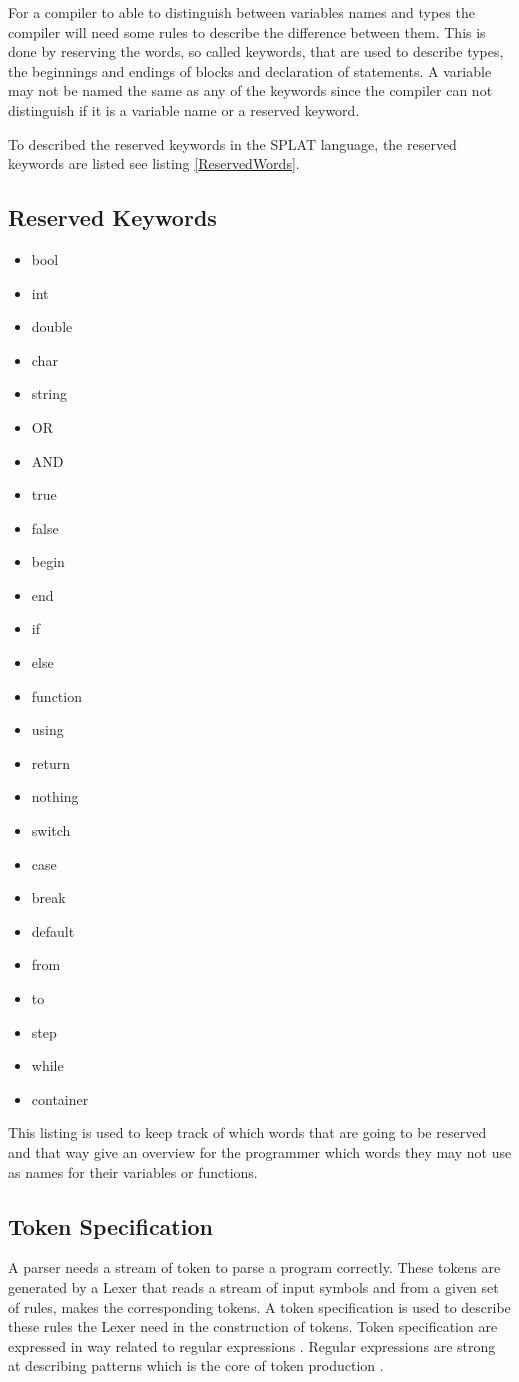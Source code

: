 For a compiler to able to distinguish between variables names and types the compiler will need some rules to describe the difference between them. This is done by reserving the words, so called keywords, that are used to describe types, the beginnings and endings of blocks and declaration of statements. A variable may not be named the same as any of the keywords since the compiler can not distinguish if it is a variable name or a reserved keyword.

To described the reserved keywords in the SPLAT language, the reserved keywords are listed see listing \ref{ReservedWords}.
\subsection{Reserved Keywords}
\begin{itemize}
\label{lst:ReservedWords}
\item bool
\item int
\item double
\item char
\item string
\item OR
\item AND
\item true
\item false
\item begin
\item end
\item if
\item else
\item function
\item using
\item return
\item nothing
\item switch
\item case
\item break
\item default
\item from
\item to
\item step
\item while
\item container

\end{itemize}
This listing is used to keep track of which words that are going to be reserved and that way give an overview for the programmer which words they may not use as names for their variables or functions. 

\subsection{Token Specification}
A parser needs a stream of token to parse a program correctly. These tokens are generated by a Lexer that reads a stream of input symbols and from a given set of rules, makes the corresponding tokens. A token specification is used to describe these rules the Lexer need in the construction of tokens. Token specification are expressed in way related to regular expressions . Regular expressions are strong at describing patterns which is the core of token production .

